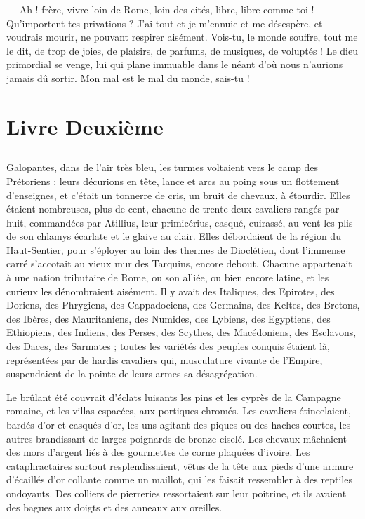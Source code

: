\documentclass[a4paper, 11pt, oneside, polutonikogreek, french]{article}
\begin{document}
--- Ah ! frère, vivre loin de Rome, loin des cités, libre, libre comme toi ! Qu'importent tes privations ? J'ai tout et je m'ennuie et me désespère, et voudrais mourir, ne pouvant respirer aisément. Vois-tu, le monde souffre, tout me le dit, de trop de joies, de plaisirs, de parfums, de musiques, de voluptés ! Le dieu primordial se venge, lui qui plane immuable dans le néant d'où nous n'aurions jamais dû sortir. Mon mal est le mal du monde, sais-tu !
\clearpage
\section{Livre Deuxième}
\subsection{}
\paragraph{}
Galopantes, dans de l'air très bleu, les turmes voltaient vers le camp des Prétoriens ; leurs décurions en tête, lance et arcs au poing sous un flottement d'enseignes, et c'était un tonnerre de cris, un bruit de chevaux, à étourdir. Elles étaient nombreuses, plus de cent, chacune de trente-deux cavaliers rangés par huit, commandées par Atillius, leur primicérius, casqué, cuirassé, au vent les plis de son chlamys écarlate et le glaive au clair. Elles débordaient de la région du Haut-Sentier, pour s'éployer au loin des thermes de Dioclétien, dont l'immense carré s'accotait au vieux mur des Tarquins, encore debout. Chacune appartenait à une nation tributaire de Rome, ou son alliée, ou bien encore latine, et les curieux les dénombraient aisément. Il y avait des Italiques, des Epirotes, des Doriens, des Phrygiens, des Cappadociens, des Germains, des Keltes, des Bretons, des Ibères, des Mauritaniens, des Numides, des Lybiens, des Egyptiens, des Ethiopiens, des Indiens, des Perses, des Scythes, des Macédoniens, des Esclavons, des Daces, des Sarmates ; toutes les variétés des peuples conquis étaient là, représentées par de hardis cavaliers qui, musculature vivante de l'Empire, suspendaient de la pointe de leurs armes sa désagrégation.

Le brûlant été couvrait d'éclats luisants les pins et les cyprès de la Campagne romaine, et les villas espacées, aux portiques chromés. Les cavaliers étincelaient, bardés d'or et casqués d'or, les uns agitant des piques ou des haches courtes, les autres brandissant de larges poignards de bronze ciselé. Les chevaux mâchaient des mors d'argent liés à des gourmettes de corne plaquées d'ivoire. Les cataphractaires surtout resplendissaient, vêtus de la tête aux pieds d'une armure d'écaillés d'or collante comme un maillot, qui les faisait ressembler à des reptiles ondoyants. Des colliers de pierreries ressortaient sur leur poitrine, et ils avaient des bagues aux doigts et des anneaux aux oreilles.
\end{document}
